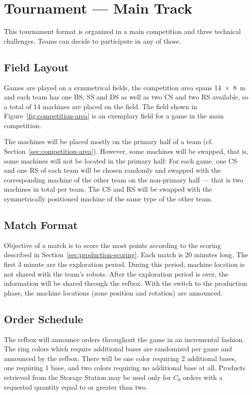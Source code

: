 \documentclass[12pt,twoside]{article}
\newcommand{\refsec}[1]{Section~\ref{#1}}
\newcommand{\reffig}[1]{Figure~\ref{#1}}
\begin{document}


\section{Tournament --- Main Track}
\label{sec:tournament-main}
This tournament format is organized in a main competition and three technical
challenges. Teams can decide to participate in any of those.

\subsection{Field Layout}
Games are played on a symmetrical fields, the competition area spans
\SI{14 x 8}{\metre} and each team has one \ac{BS}, \ac{SS} %
and \ac{DS} as well as  two \ac{CS} and two \ac{RS} available,
so a total of 14 machines are placed on the field.
The field shown in \reffig{fig:competition-area} is an exemplary field for
a game in the main competition.

The machines will be placed mostly on the primary half
of a team (cf. \refsec{sec:competition-area}). However, some machines will be
swapped, that is, some machines will not be located in the primary
half:
For each game, one \ac{CS} and one \ac{RS} of each team will be chosen randomly
and swapped with the corresponding machine of the other team on the
non-primary half --- that is two machines in total per team. The \ac{CS} and
\ac{RS} will be swapped with the symmetrically positioned machine of the
same type of the other team.

\subsection{Match Format}
Objective of a match is to score the most points according to the scoring
described in \refsec{sec:production-scoring}.
Each match is 20 minutes long. The first 3 minute are the exploration period.
During this period, machine location is not shared with the team's robots. After
the exploration period is over, the information will be shared through the
\ac{refbox}.
With the switch to the production phase, the machine locations (zone position
and rotation) are announced.

\subsection{Order Schedule}
The \ac{refbox} will announce orders throughout the game in an
incremental fashion.
The ring colors which
require additional bases are randomized per game and announced by the
refbox. There will be one color requiring 2 additional bases, one
requiring 1 base, and two colors requiring no additional base at
all. Products retrieved from the Storage Station may be used only for
$C_0$ orders with a requested quantity equal to or greater than two.
\end{document}
